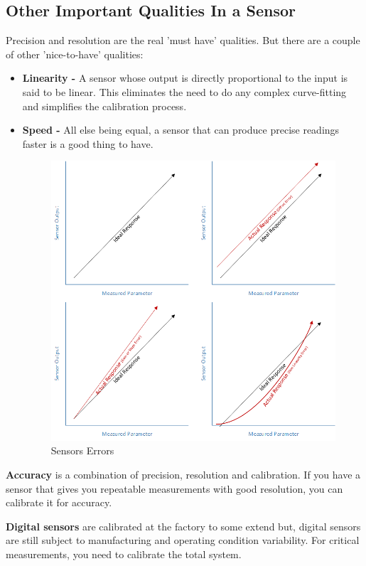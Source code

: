 \documentclass[a4paper,12pt]{report}
\begin{document}
\subsection{Other Important Qualities In a Sensor}
Precision and resolution are the real 'must have' qualities.  But there are a couple of other 'nice-to-have' qualities:
\begin{itemize}
 \item \textbf{Linearity -} A sensor whose output is directly proportional to the input is said to be linear.  This eliminates the need to do any complex curve-fitting and simplifies the calibration process.
\item \textbf{Speed -} All else being equal, a sensor that can produce precise readings faster is a good thing to have.
\begin{figure}[h!]
 \includegraphics[width=\textwidth]{figures/sensors_Errors.png}
 \caption{Sensors Errors}
\end{figure}
\end{itemize}

\textbf{Accuracy} is a combination of precision, resolution and calibration.  
If you have a sensor that gives you repeatable measurements with good resolution, you can calibrate it for accuracy.\cite{Adafruit}
\newline

\textbf{Digital sensors} are calibrated at the factory to some extend  but, digital sensors are still subject to manufacturing 
and operating condition variability.  For critical measurements, you need to calibrate the total system.\cite{Adafruit}
\end{document}
